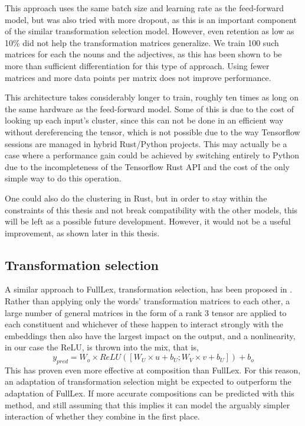 \documentclass[a4paper, 12pt]{scrartcl}
\begin{document}
This approach uses the same batch size and learning rate as the feed-forward model, but was also tried with more dropout, as this is an important component of the similar transformation selection model. However, even retention as low as 10\% did not help the transformation matrices generalize. We train 100 such matrices for each the nouns and the adjectives, as this has been shown to be more than sufficient differentiation for this type of approach. Using fewer matrices and more data points per matrix does not improve performance.

This architecture takes considerably longer to train, roughly ten times as long on the same hardware as the feed-forward model. Some of this is due to the cost of looking up each input's cluster, since this can not be done in an efficient way without dereferencing the tensor, which is not possible due to the way Tensorflow sessions are managed in hybrid Rust/Python projects. This may actually be a case where a performance gain could be achieved by switching entirely to Python due to the incompleteness of the Tensorflow Rust API and the cost of the only simple way to do this operation.

One could also do the clustering in Rust, but in order to stay within the constraints of this thesis and not break compatibility with the other models, this will be left as a possible future development. However, it would not be a useful improvement, as shown later in this thesis.

\subsection{Transformation selection}
A similar approach to FullLex, transformation selection, has been proposed in \cite{TSelect}. Rather than applying only the words' transformation matrices to each other, a large number of general matrices in the form of a rank 3 tensor are applied to each constituent and whichever of these happen to interact strongly with the embeddings then also have the largest impact on the output, and a nonlinearity, in our case the ReLU, is thrown into the mix, that is, $$ y_{pred} = W_o \times ReLU([W_U \times u + b_U; W_V \times v + b_U]) + b_o $$ This has proven even more effective at composition than FullLex. For this reason, an adaptation of transformation selection might be expected to outperform the adaptation of FullLex. If more accurate compositions can be predicted with this method, and still assuming that this implies it can model the arguably simpler interaction of whether they combine in the first place.
\end{document}
